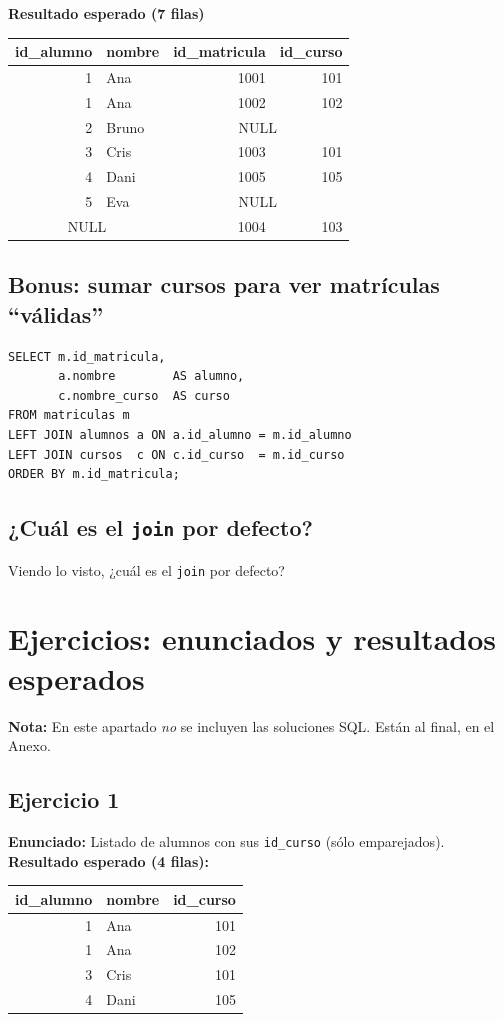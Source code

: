 \documentclass[11pt,a4paper]{article}
\begin{document}
\textbf{Resultado esperado (7 filas)}
\begin{center}
\begin{tabular}{r l r r}
\toprule
id\_alumno & nombre & id\_matricula & id\_curso \\
\midrule
1   & Ana   & 1001 & 101 \\
1   & Ana   & 1002 & 102 \\
2   & Bruno & \multicolumn{2}{c}{NULL} \\
3   & Cris  & 1003 & 101 \\
4   & Dani  & 1005 & 105 \\
5   & Eva   & \multicolumn{2}{c}{NULL} \\
\multicolumn{2}{c}{NULL} & 1004 & 103 \\
\bottomrule
\end{tabular}
\end{center}

\subsection*{Bonus: sumar cursos para ver matrículas “válidas”}
\begin{lstlisting}
SELECT m.id_matricula,
       a.nombre        AS alumno,
       c.nombre_curso  AS curso
FROM matriculas m
LEFT JOIN alumnos a ON a.id_alumno = m.id_alumno
LEFT JOIN cursos  c ON c.id_curso  = m.id_curso
ORDER BY m.id_matricula;
\end{lstlisting}

\subsection*{¿Cuál es el \texttt{join} por defecto?}
Viendo lo visto, ¿cuál es el \texttt{join} por defecto?

\section{Ejercicios: enunciados y resultados esperados}

\textbf{Nota:} En este apartado \emph{no} se incluyen las soluciones SQL. Están al final, en el Anexo.

\subsection*{Ejercicio 1}
\textbf{Enunciado:} Listado de alumnos con sus \texttt{id\_curso} (sólo emparejados).\\
\textbf{Resultado esperado (4 filas):}
\begin{center}
\begin{tabular}{r l r}
\toprule
id\_alumno & nombre & id\_curso \\
\midrule
1 & Ana  & 101 \\
1 & Ana  & 102 \\
3 & Cris & 101 \\
4 & Dani & 105 \\
\bottomrule
\end{tabular}
\end{center}
\end{document}
